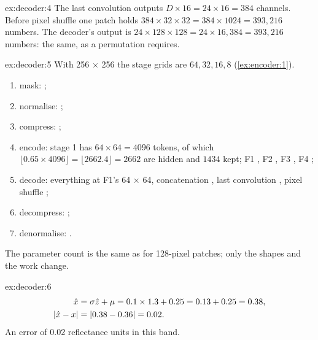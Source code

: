 \begin{solution}{ex:decoder:4}
The last convolution outputs $D \times 16 = 24 \times 16 = 384$ channels. Before pixel shuffle one patch
holds $384 \times 32 \times 32 = 384 \times 1024 = 393{,}216$ numbers. The decoder's output is
$24 \times 128 \times 128 = 24 \times 16{,}384 = 393{,}216$ numbers: the same, as a permutation requires.
\end{solution}

\begin{solution}{ex:decoder:5}
With 256 $\times$ 256 the stage grids are $64, 32, 16, 8$ (\cref{ex:encoder:1}).
\begin{enumerate}
\item mask: ;
\item normalise: ;
\item compress: ;
\item encode: stage 1 has $64 \times 64 = 4096$ tokens, of which $\lfloor 0.65 \times 4096 \rfloor =
\lfloor 2662.4 \rfloor = 2662$ are hidden and $1434$ kept; F1 , F2 , F3 , F4 ;
\item decode: everything at F1's 64 $\times$ 64, concatenation , last
convolution , pixel shuffle ;
\item decompress: ;
\item denormalise: .
\end{enumerate}
The parameter count is the same as for 128-pixel patches; only the shapes and the work change.
\end{solution}

\begin{solution}{ex:decoder:6}
\begin{align*}
\hat{x} &= \sigma \hat{z} + \mu = 0.1 \times 1.3 + 0.25 = 0.13 + 0.25 = 0.38,\\
\left\lvert \hat{x} - x \right\rvert &= \left\lvert 0.38 - 0.36 \right\rvert = 0.02 .
\end{align*}
An error of 0.02 reflectance units in this band.
\end{solution}

